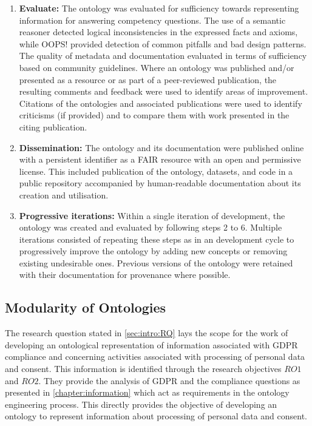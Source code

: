 \begin{enumerate}
    \item \textbf{Evaluate:} The ontology was evaluated for sufficiency towards representing information for answering competency questions. The use of a semantic reasoner detected logical inconsistencies in the expressed facts and axioms, while OOPS! provided detection of common pitfalls and bad design patterns.
    The quality of metadata and documentation evaluated in terms of sufficiency based on community guidelines. Where an ontology was published and/or presented as a resource or as part of a peer-reviewed publication, the resulting comments and feedback were used to identify areas of improvement. Citations of the ontologies and associated publications were used to identify criticisms (if provided) and to compare them with work presented in the citing publication.
    \item \textbf{Dissemination:} The ontology and its documentation were published online with a persistent identifier as a FAIR resource with an open and permissive license. This included publication of the ontology, datasets, and code in a public repository accompanied by human-readable documentation about its creation and utilisation.
    \item \textbf{Progressive iterations:} Within a single iteration of development, the ontology was created and evaluated by following steps 2 to 6. Multiple iterations consisted of repeating these steps as in an development cycle to progressively improve the ontology by adding new concepts or removing existing undesirable ones. Previous versions of the ontology were retained with their documentation for provenance where possible.
\end{enumerate}

\subsection*{Modularity of Ontologies}
The research question stated in \autoref{sec:intro:RQ} lays the scope for the work of developing an ontological re{}presentation of information associated with GDPR compliance and concerning activities associated with processing of personal data and consent.
This information is identified through the research objectives $RO1$ and $RO2$.
They provide the analysis of GDPR and the compliance questions as presented in \autoref{chapter:information} which act as requirements in the ontology engineering process.
This directly provides the objective of developing an ontology to represent information about processing of personal data and consent.

